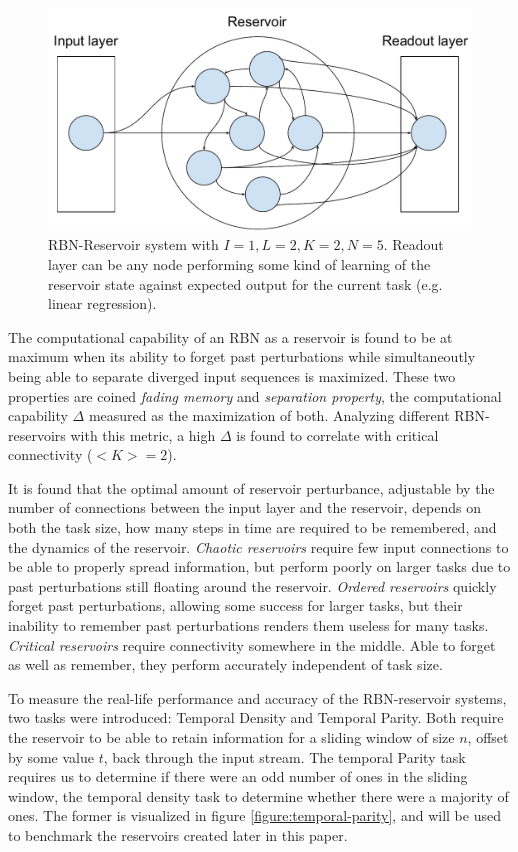 \begin{figure}
  \centering
  \includegraphics[width=\columnwidth]{background/RBN-Reservoir.pdf}
  \caption{RBN-Reservoir system with $I=1, L=2, K=2, N=5$.
  Readout layer can be any node performing some kind of learning of the reservoir state against expected output for the current task (e.g. linear regression).}
  \label{figure:rbn-reservoir}
\end{figure}

The computational capability of an RBN as a reservoir is found to be at maximum when its ability to forget past perturbations
while simultaneoutly being able to separate diverged input sequences is maximized.
These two properties are coined \textit{fading memory} and \textit{separation property},
the computational capability $\Delta$ measured as the maximization of both.
Analyzing different RBN-reservoirs with this metric,
a high $\Delta$ is found to correlate with critical connectivity ($<K>=2$).

It is found that the optimal amount of reservoir perturbance,
adjustable by the number of connections between the input layer and the reservoir,
depends on both the task size, how many steps in time are required to be remembered,
and the dynamics of the reservoir.
\textit{Chaotic reservoirs} require few input connections to be able to properly spread information,
but perform poorly on larger tasks due to past perturbations still floating around the reservoir.
\textit{Ordered reservoirs} quickly forget past perturbations, allowing some success for larger tasks,
but their inability to remember past perturbations renders them useless for many tasks.
\textit{Critical reservoirs} require connectivity somewhere in the middle.
Able to forget as well as remember, they perform accurately independent of task size.

To measure the real-life performance and accuracy of the RBN-reservoir systems, two tasks were introduced: Temporal Density and Temporal Parity.
Both require the reservoir to be able to retain information for a sliding window of size $ n $,
offset by some value $ t $, back through the input stream.
The temporal Parity task requires us to determine if there were an odd number of ones in the sliding window,
the temporal density task to determine whether there were a majority of ones.
The former is visualized in figure \ref{figure:temporal-parity},
and will be used to benchmark the reservoirs created later in this paper.

